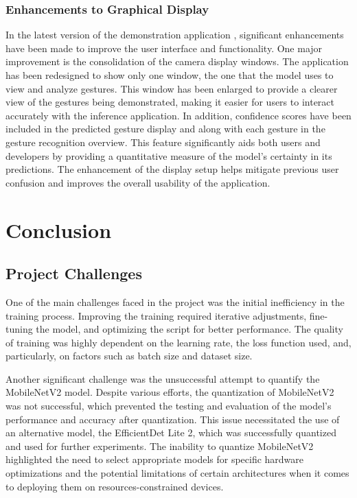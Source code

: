 \subsection{Enhancements to Graphical Display}
In the latest version of the demonstration application \cite{gajdosik2024gesture}, significant enhancements have been made to improve the user interface and functionality. One major improvement is the consolidation of the camera display windows. The application has been redesigned to show only one window, the one that the model uses to view and analyze gestures. This window has been enlarged to provide a clearer view of the gestures being demonstrated, making it easier for users to interact accurately with the inference application. In addition, confidence scores have been included in the predicted gesture display and along with each gesture in the gesture recognition overview. This feature significantly aids both users and developers by providing a quantitative measure of the model's certainty in its predictions. The enhancement of the display setup helps mitigate previous user confusion and improves the overall usability of the application.

\chapter{Conclusion}
\section{Project Challenges}

One of the main challenges faced in the project was the initial inefficiency in the training process. Improving the training required iterative adjustments, fine-tuning the model, and optimizing the script for better performance. The quality of training was highly dependent on the learning rate, the loss function used, and, particularly, on factors such as batch size and dataset size.

Another significant challenge was the unsuccessful attempt to quantify the MobileNetV2 model. Despite various efforts, the quantization of MobileNetV2 was not successful, which prevented the testing and evaluation of the model's performance and accuracy after quantization. This issue necessitated the use of an alternative model, the EfficientDet Lite 2, which was successfully quantized and used for further experiments. The inability to quantize MobileNetV2 highlighted the need to select appropriate models for specific hardware optimizations and the potential limitations of certain architectures when it comes to deploying them on resources-constrained devices.

